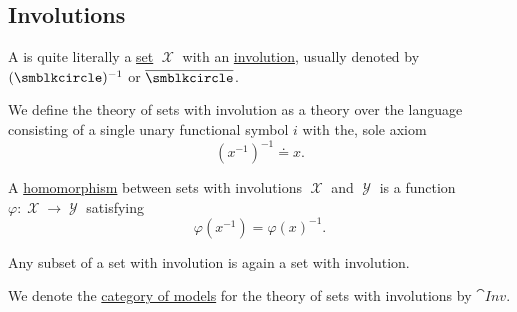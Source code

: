 \subsection{Involutions}\label{subsec:involutions}

\begin{definition}\label{def:set_with_involution}
  A  is quite literally a \hyperref[def:set]{set} \( \mscrX \) with an \hyperref[def:multi_valued_function/involution]{involution}, usually denoted by \( (\placeholder)^{-1} \) or \( \overline \placeholder \).

  \begin{thmenum}
     We define the theory of sets with involution as a theory over the language consisting of a single unary functional symbol \( i \) with the, sole axiom
    \begin{equation}\label{eq:def:set_with_involution/theory/axiom}
      (x^{-1})^{-1} \doteq x.
    \end{equation}

     A \hyperref[def:first_order_homomorphism]{homomorphism} between sets with involutions \( \mscrX \) and \( \mscrY \) is a function \( \varphi: \mscrX \to \mscrY \) satisfying
    \begin{equation}\label{eq:def:set_with_involution/homomorphism}
      \varphi(x^{-1})
      =
      \varphi(x)^{-1}.
    \end{equation}

     Any subset of a set with involution is again a set with involution.

     We denote the \hyperref[def:category_of_small_first_order_models]{category of models} for the theory of sets with involutions by \( \cat{Inv} \).
  \end{thmenum}
\end{definition}
